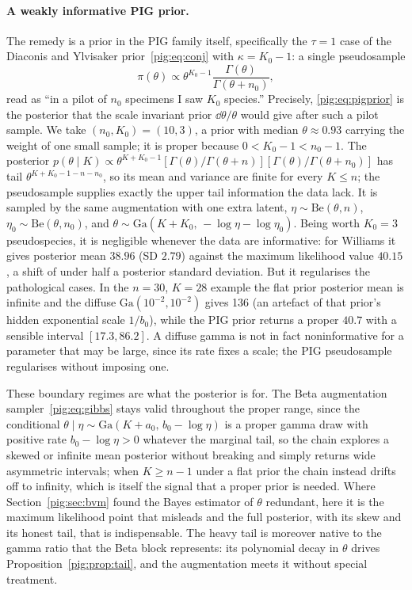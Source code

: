 \paragraph{A weakly informative PIG prior.} The remedy is a prior in the PIG family itself, specifically the $\tau=1$ case of the Diaconis and Ylvisaker prior~\eqref{pig:eq:conj} with $\kappa=K_0-1$: a single pseudosample
\begin{equation}\label{pig:eq:pigprior}
\pi(\theta)\propto\theta^{K_0-1}\frac{\Gamma(\theta)}{\Gamma(\theta+n_0)},
\end{equation}
read as ``in a pilot of $n_0$ specimens I saw $K_0$ species.'' Precisely, \eqref{pig:eq:pigprior} is the posterior that the scale invariant prior $\dd\theta/\theta$ would give after such a pilot sample. We take $(n_0,K_0)=(10,3)$, a prior with median $\theta\approx0.93$ carrying the weight of one small sample; it is proper because $0<K_0-1<n_0-1$. The posterior $p(\theta\mid K)\propto\theta^{K+K_0-1}[\Gamma(\theta)/\Gamma(\theta+n)][\Gamma(\theta)/\Gamma(\theta+n_0)]$ has tail $\theta^{K+K_0-1-n-n_0}$, so its mean and variance are finite for every $K\le n$; the pseudosample supplies exactly the upper tail information the data lack. It is sampled by the same augmentation with one extra latent, $\eta\sim\mathrm{Be}(\theta,n)$, $\eta_0\sim\mathrm{Be}(\theta,n_0)$, and $\theta\sim\mathrm{Ga}(K+K_0,\,-\log\eta-\log\eta_0)$. Being worth $K_0=3$ pseudospecies, it is negligible whenever the data are informative: for Williams it gives posterior mean $38.96$ (SD $2.79$) against the maximum likelihood value $40.15$, a shift of under half a posterior standard deviation. But it regularises the pathological cases. In the $n=30$, $K=28$ example the flat prior posterior mean is infinite and the diffuse $\mathrm{Ga}(10^{-2},10^{-2})$ gives 136 (an artefact of that prior's hidden exponential scale $1/b_0$), while the PIG prior returns a proper $40.7$ with a sensible interval $[17.3, 86.2]$. A diffuse gamma is not in fact noninformative for a parameter that may be large, since its rate fixes a scale; the PIG pseudosample regularises without imposing one.

These boundary regimes are what the posterior is for. The Beta augmentation sampler~\eqref{pig:eq:gibbs} stays valid throughout the proper range, since the conditional $\theta\mid\eta\sim\mathrm{Ga}(K+a_0,\,b_0-\log\eta)$ is a proper gamma draw with positive rate $b_0-\log\eta>0$ whatever the marginal tail, so the chain explores a skewed or infinite mean posterior without breaking and simply returns wide asymmetric intervals; when $K\ge n-1$ under a flat prior the chain instead drifts off to infinity, which is itself the signal that a proper prior is needed. Where Section~\ref{pig:sec:bvm} found the Bayes estimator of $\theta$ redundant, here it is the maximum likelihood point that misleads and the full posterior, with its skew and its honest tail, that is indispensable. The heavy tail is moreover native to the gamma ratio that the Beta block represents: its polynomial decay in $\theta$ drives Proposition~\ref{pig:prop:tail}, and the augmentation meets it without special treatment.


